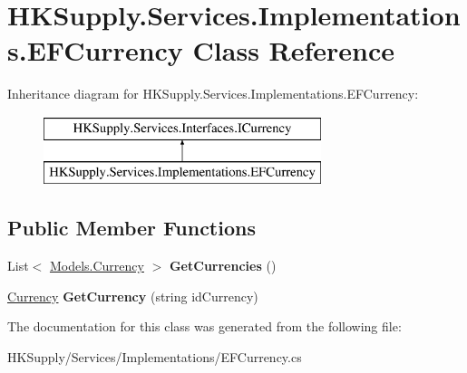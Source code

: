 \hypertarget{class_h_k_supply_1_1_services_1_1_implementations_1_1_e_f_currency}{}\section{H\+K\+Supply.\+Services.\+Implementations.\+E\+F\+Currency Class Reference}
\label{class_h_k_supply_1_1_services_1_1_implementations_1_1_e_f_currency}
Inheritance diagram for H\+K\+Supply.\+Services.\+Implementations.\+E\+F\+Currency\+:\begin{figure}[H]
\begin{center}
\leavevmode
\includegraphics[height=2.000000cm]{class_h_k_supply_1_1_services_1_1_implementations_1_1_e_f_currency}
\end{center}
\end{figure}
\subsection*{Public Member Functions}
\begin{DoxyCompactItemize}
\item 
\mbox{\label{class_h_k_supply_1_1_services_1_1_implementations_1_1_e_f_currency_a0ccba73a596c248bf16649b861394389}} 
List$<$ \mbox{\hyperlink{class_h_k_supply_1_1_models_1_1_currency}{Models.\+Currency}} $>$ {\bfseries Get\+Currencies} ()
\item 
\mbox{\label{class_h_k_supply_1_1_services_1_1_implementations_1_1_e_f_currency_a37d248dd256b7310f19b0d9c8f011129}} 
\mbox{\hyperlink{class_h_k_supply_1_1_models_1_1_currency}{Currency}} {\bfseries Get\+Currency} (string id\+Currency)
\end{DoxyCompactItemize}


The documentation for this class was generated from the following file\+:\begin{DoxyCompactItemize}
\item 
H\+K\+Supply/\+Services/\+Implementations/E\+F\+Currency.\+cs\end{DoxyCompactItemize}
